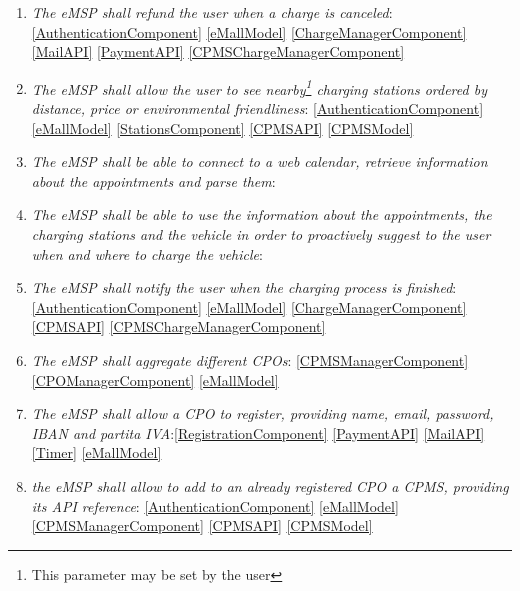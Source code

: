 \begin{enumerate}[label=\textbf{R\arabic*}]
    \item \textit{The \ac{eMSP} shall refund the user when a charge is canceled}:
    \ref{AuthenticationComponent}
    \ref{eMallModel}
    \ref{ChargeManagerComponent}
    \ref{MailAPI}
    \ref{PaymentAPI}
    \ref{CPMSChargeManagerComponent}
    \label{req:eMSP-refund}
    \item \textit{The \ac{eMSP} shall allow the user to see nearby\footnote{This parameter may be set by the user} charging stations ordered by distance, price or environmental friendliness}:
    \ref{AuthenticationComponent}
    \ref{eMallModel}
    \ref{StationsComponent}
    \ref{CPMSAPI}
    \ref{CPMSModel}
    \label{req:eMSP-see-stations}
    \item \textit{The \ac{eMSP} shall be able to connect to a web calendar, retrieve information about the appointments and parse them}:
    \label{req:eMSP-connect-calendar}
    \item \textit{The \ac{eMSP} shall be able to use the information about the appointments, the charging stations and the vehicle in order to proactively suggest to the user when and where to charge the vehicle}:
    \label{req:eMSP-proactive-suggestions}
    \item \textit{The \ac{eMSP} shall notify the user when the charging process is finished}:
    \ref{AuthenticationComponent}
    \ref{eMallModel}
    \ref{ChargeManagerComponent}
    \ref{CPMSAPI}
    \ref{CPMSChargeManagerComponent}
    \label{req:eMSP-notification}
    \item \textit{The \ac{eMSP} shall aggregate different \acp{CPO}}:
    \ref{CPMSManagerComponent}
    \ref{CPOManagerComponent}
    \ref{eMallModel}
    \label{req:eMSP-compatible}
    \item \textit{The \ac{eMSP} shall allow a \ac{CPO} to register, providing name, email, password, \ac{IBAN} and \gls{partita IVA}}:\ref{RegistrationComponent}
    \ref{PaymentAPI}
    \ref{MailAPI}
    \ref{Timer}
    \ref{eMallModel}
    \label{req:eMSP-cpo-registration}
    \item \textit{the \ac{eMSP} shall allow to add to an already registered \ac{CPO} a \ac{CPMS}, providing its \ac{API} reference}:
    \ref{AuthenticationComponent}
    \ref{eMallModel}
    \ref{CPMSManagerComponent}
    \ref{CPMSAPI}
    \ref{CPMSModel}
    \label{req:eMSP-add-cpms}

\end{enumerate}
